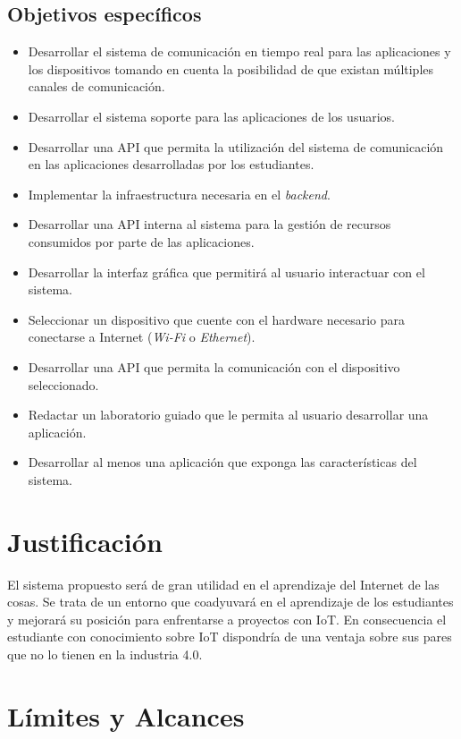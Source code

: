 \subsection{Objetivos específicos}
\begin{itemize}
	\item Desarrollar el sistema de comunicación en tiempo real para las aplicaciones y los dispositivos
tomando en cuenta la posibilidad de que existan múltiples canales de comunicación.
	\item Desarrollar el sistema soporte para las aplicaciones de los usuarios.
	\item Desarrollar una API que permita la utilización del sistema de comunicación en las aplicaciones
desarrolladas por los estudiantes.
	\item Implementar la infraestructura necesaria en el \textit{backend}.
	\item Desarrollar una API interna al sistema para la gestión de recursos consumidos por parte
de las aplicaciones.
	\item Desarrollar la interfaz gráfica que permitirá al usuario interactuar con el sistema.
	\item Seleccionar un dispositivo que cuente con el hardware necesario para conectarse a Internet
(\textit{Wi-Fi} o \textit{Ethernet}).
	\item Desarrollar una API que permita la comunicación con el dispositivo seleccionado.
	\item Redactar un laboratorio guiado que le permita al usuario desarrollar una aplicación.
	\item Desarrollar al menos una aplicación que exponga las características del sistema.
\end{itemize}
\section{Justificación}
El sistema propuesto será de gran utilidad en el aprendizaje del Internet de las cosas. Se trata
de un entorno que coadyuvará en el aprendizaje de los estudiantes y mejorará su posición para
enfrentarse a proyectos con IoT. En consecuencia el estudiante con conocimiento sobre IoT dispondría de una ventaja sobre sus pares que no lo tienen en la industria 4.0.
\section{Límites y Alcances}
